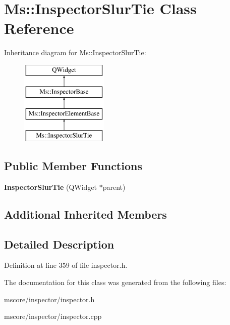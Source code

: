 \hypertarget{class_ms_1_1_inspector_slur_tie}{}\section{Ms\+:\+:Inspector\+Slur\+Tie Class Reference}
\label{class_ms_1_1_inspector_slur_tie}
Inheritance diagram for Ms\+:\+:Inspector\+Slur\+Tie\+:\begin{figure}[H]
\begin{center}
\leavevmode
\includegraphics[height=4.000000cm]{class_ms_1_1_inspector_slur_tie}
\end{center}
\end{figure}
\subsection*{Public Member Functions}
\begin{DoxyCompactItemize}
\item 
\mbox{\label{class_ms_1_1_inspector_slur_tie_a4f92f3e649ae190b1c794f44aca6ff33}} 
{\bfseries Inspector\+Slur\+Tie} (Q\+Widget $\ast$parent)
\end{DoxyCompactItemize}
\subsection*{Additional Inherited Members}


\subsection{Detailed Description}


Definition at line 359 of file inspector.\+h.



The documentation for this class was generated from the following files\+:\begin{DoxyCompactItemize}
\item 
mscore/inspector/inspector.\+h\item 
mscore/inspector/inspector.\+cpp\end{DoxyCompactItemize}
